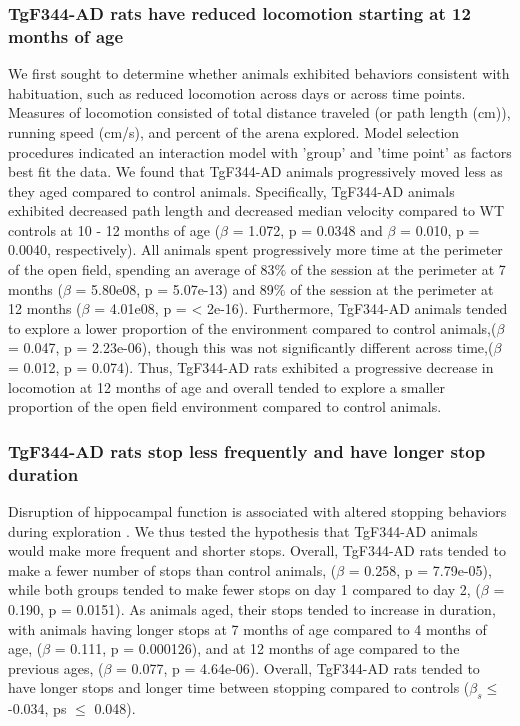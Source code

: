 \documentclass[fleqn,10pt]{wlscirep}
\begin{document}
\subsubsection*{TgF344-AD rats have reduced locomotion starting at 12 months of age}
We first sought to determine whether animals exhibited behaviors consistent with habituation, such as reduced locomotion across days or across time points. Measures of locomotion consisted of total distance traveled (or path length (cm)), running speed (cm/s), and percent of the arena explored. Model selection procedures indicated an interaction model with 'group' and 'time point' as factors best fit the data. We found that TgF344-AD animals progressively moved less as they aged compared to control animals. Specifically, TgF344-AD animals exhibited decreased path length and decreased median velocity compared to WT controls at 10 - 12 months of age ($\beta$ = 1.072, p =  0.0348 and $\beta$ = 0.010, p = 0.0040, respectively). All animals spent progressively more time at the perimeter of the open field, spending an average of 83$\%$ of the session at the perimeter at 7 months ($\beta$ = 5.80e08, p = 5.07e-13)  and 89$\%$ of the session at the perimeter at 12 months ($\beta$ = 4.01e08, p = < 2e-16). Furthermore, TgF344-AD animals tended to explore a lower proportion of the environment compared to control animals,($\beta$ = 0.047, p = 2.23e-06), though this was not significantly different across time,($\beta$ = 0.012, p = 0.074). Thus, TgF344-AD rats exhibited a progressive decrease in locomotion at 12 months of age and overall tended to explore a smaller proportion of the open field environment compared to control animals. 

\subsubsection*{TgF344-AD rats stop less frequently and have longer stop duration}   
Disruption of hippocampal function is associated with altered stopping behaviors during exploration \cite{martin_medial_2007}. We thus tested the hypothesis that TgF344-AD animals would make more frequent and shorter stops. Overall, TgF344-AD rats tended to make a fewer number of stops than control animals, ($\beta$ = 0.258, p = 7.79e-05), while both groups tended to make fewer stops on day 1 compared to day 2, ($\beta$ = 0.190, p = 0.0151). As animals aged, their stops tended to increase in duration, with animals having longer stops at 7 months of age compared to 4 months of age, ($\beta$ = 0.111, p = 0.000126), and at 12 months of age compared to the previous ages, ($\beta$ = 0.077, p = 4.64e-06). Overall, TgF344-AD rats tended to have longer stops and longer time between stopping compared to controls ($\beta_s \leq$ -0.034, ps $\leq$ 0.048). 
\end{document}
